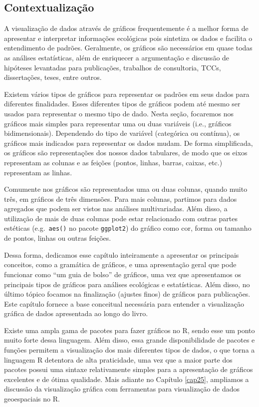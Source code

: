 \documentclass[
]{article}
\begin{document}
\hypertarget{contextualizauxe7uxe3o-2}{%
\subsection{Contextualização}\label{contextualizauxe7uxe3o-2}}

A visualização de dados através de gráficos frequentemente é a melhor forma de apresentar e interpretar informações ecológicas pois sintetiza os dados e facilita o entendimento de padrões. Geralmente, os gráficos são necessários em quase todas as análises estatísticas, além de enriquecer a argumentação e discussão de hipóteses levantadas para publicações, trabalhos de consultoria, TCCs, dissertações, teses, entre outros.

Existem vários tipos de gráficos para representar os padrões em seus dados para diferentes finalidades. Esses diferentes tipos de gráficos podem até mesmo ser usados para representar o mesmo tipo de dado. Nesta seção, focaremos nos gráficos mais simples para representar uma ou duas variáveis (i.e., gráficos bidimensionais). Dependendo do tipo de variável (categórica ou contínua), os gráficos mais indicados para representar os dados mudam. De forma simplificada, os gráficos são representações dos nossos dados tabulares, de modo que os eixos representam as colunas e as feições (pontos, linhas, barras, caixas, etc.) representam as linhas.

Comumente nos gráficos são representados uma ou duas colunas, quando muito três, em gráficos de três dimensões. Para mais colunas, partimos para dados agregados que podem ser vistos nas análises multivariadas. Além disso, a utilização de mais de duas colunas pode estar relacionado com outras partes estéticas (e.g.~\texttt{aes()} no pacote \texttt{ggplot2}) do gráfico como cor, forma ou tamanho de pontos, linhas ou outras feições.

Dessa forma, dedicamos esse capítulo inteiramente a apresentar os principais conceitos, como a gramática de gráficos, e uma apresentação geral que pode funcionar como ``um guia de bolso'' de gráficos, uma vez que apresentamos os principais tipos de gráficos para análises ecológicas e estatísticas. Além disso, no último tópico focamos na finalização (ajustes finos) de gráficos para publicações. Este capítulo fornece a base conceitual necessária para entender a visualização gráfica de dados apresentada ao longo do livro.

Existe uma ampla gama de pacotes para fazer gráficos no R, sendo esse um ponto muito forte dessa linguagem. Além disso, essa grande disponibilidade de pacotes e funções permitem a visualização dos mais diferentes tipos de dados, o que torna a linguagem R detentora de alta praticidade, uma vez que a maior parte dos pacotes possui uma sintaxe relativamente simples para a apresentação de gráficos excelentes e de ótima qualidade. Mais adiante no Capítulo \ref{cap25}, ampliamos a discussão da visualização gráfica com ferramentas para visualização de dados geoespaciais no R.
\end{document}
